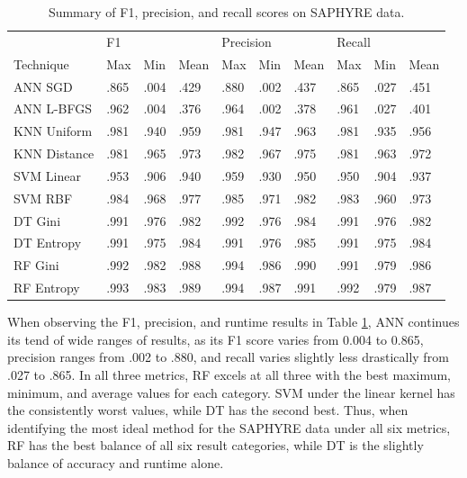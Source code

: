 \documentclass[12pt]{uthesis-v12}  %
\begin{document}
\begin{table}[!t]
\caption{Summary of F1, precision, and recall scores on SAPHYRE data.}
\renewcommand{\arraystretch}{1.3}
\centering
{\begin{tabular}{*{10}{l}}
\toprule
& \multicolumn{3}{l}{F1} & \multicolumn{3}{l}{Precision} & \multicolumn{3}{l}{Recall} \\
Technique & Max & Min & Mean & Max & Min & Mean & Max & Min & Mean \\ \midrule
ANN SGD & .865 & .004 & .429 & .880 & .002 & .437 & .865 & .027 & .451 \\ 
ANN L-BFGS & .962 & .004 & .376 & .964 & .002 & .378 & .961 & .027 & .401 \\ 
KNN Uniform & .981 & .940 & .959 & .981 & .947 & .963 & .981 & .935 & .956 \\
KNN Distance & .981 & .965 & .973 & .982 & .967 & .975 & .981 & .963 & .972 \\
SVM Linear & .953 & .906 & .940 & .959 & .930 & .950 & .950 & .904 & .937 \\
SVM RBF & .984 & .968 & .977 & .985 & .971 & .982 & .983 & .960 & .973 \\
DT Gini & .991 & .976 & .982 & .992 & .976 & .984 & .991 & .976 & .982 \\
DT Entropy & .991 & .975 & .984 & .991 & .976 & .985 & .991 & .975 & .984 \\
RF Gini & .992 & .982 & .988 & .994 & .986 & .990 & .991 & .979 & .986 \\
RF Entropy & .993 & .983 & .989 & .994 & .987 & .991 & .992 & .979 & .987 \\ \bottomrule
\end{tabular}}

\label{fpr-saphyre}
\end{table}

When observing the F1, precision, and runtime results in Table \ref{fpr-saphyre}, ANN continues its tend of wide ranges of results, as its F1 score varies from 0.004 to 0.865, precision ranges from .002 to .880, and recall varies slightly less drastically from .027 to .865. In all three metrics, RF excels at all three with the best maximum, minimum, and average values for each category. SVM under the linear kernel has the consistently worst values, while DT has the second best. Thus, when identifying the most ideal method for the SAPHYRE data under all six metrics, RF has the best balance of all six result categories, while DT is the slightly balance of accuracy and runtime alone.
\end{document}
